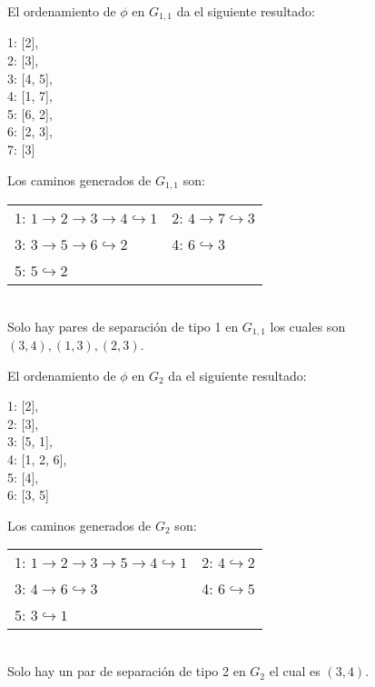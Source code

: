El ordenamiento de $\phi$ en $G_{1, 1}$ da el siguiente resultado:
\begin{center}
1: [2],\\
2: [3],\\
3: [4, 5],\\
4: [1, 7],\\
5: [6, 2],\\
6: [2, 3],\\
7: [3]
\end{center}

Los caminos generados de $G_{1, 1}$ son:
\begin{tabular}[t]{ll}
1: $1 \rightarrow 2 \rightarrow 3 \rightarrow 4 \hookrightarrow 1$ & 2: $4 \rightarrow 7 \hookrightarrow 3$ \\
3: $3 \rightarrow 5 \rightarrow 6 \hookrightarrow 2$ & 4: $6 \hookrightarrow 3$\\
5: $5 \hookrightarrow 2$ & \\
\end{tabular}\\

Solo hay pares de separación de tipo 1 en $G_{1, 1}$ los cuales son $(3, 4), (1, 3), (2, 3)$.

El ordenamiento de $\phi$ en $G_{2}$ da el siguiente resultado:
\begin{center}
1: [2],\\ 
2: [3],\\ 
3: [5, 1],\\ 
4: [1, 2, 6],\\ 
5: [4],\\ 
6: [3, 5]
\end{center}

Los caminos generados de $G_{2}$ son:
\begin{tabular}[t]{ll}
1: $1 \rightarrow 2 \rightarrow 3 \rightarrow 5 \rightarrow 4 \hookrightarrow 1$ & 2: $4 \hookrightarrow 2$ \\
3: $4 \rightarrow 6 \hookrightarrow 3$ & 4: $6 \hookrightarrow 5$\\
5: $3 \hookrightarrow 1$ & \\
\end{tabular}\\

Solo hay un par de separación de tipo 2 en $G_{2}$ el cual es $(3, 4)$.

